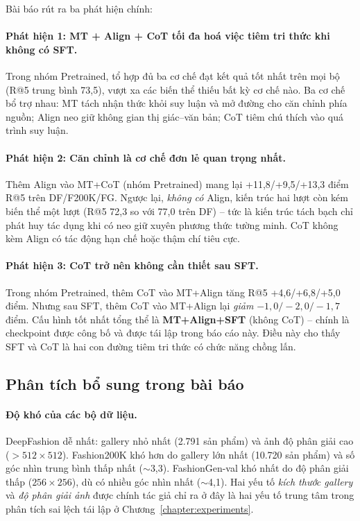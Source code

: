 Bài báo rút ra ba phát hiện chính:

\paragraph{Phát hiện 1: MT + Align + CoT tối đa hoá việc tiêm tri thức khi không có SFT.} Trong nhóm Pretrained, tổ hợp đủ ba cơ chế đạt kết quả tốt nhất trên mọi bộ (R@5 trung bình 73,5), vượt xa các biến thể thiếu bất kỳ cơ chế nào. Ba cơ chế bổ trợ nhau: MT tách nhận thức khỏi suy luận và mở đường cho căn chỉnh phía nguồn; Align neo giữ không gian thị giác--văn bản; CoT tiêm chú thích vào quá trình suy luận.

\paragraph{Phát hiện 2: Căn chỉnh là cơ chế đơn lẻ quan trọng nhất.} Thêm Align vào MT+CoT (nhóm Pretrained) mang lại +11,8/+9,5/+13,3 điểm R@5 trên DF/F200K/FG. Ngược lại, \emph{không có} Align, kiến trúc hai lượt còn kém biến thể một lượt (R@5 72,3 so với 77,0 trên DF) -- tức là kiến trúc tách bạch chỉ phát huy tác dụng khi có neo giữ xuyên phương thức tường minh. CoT không kèm Align có tác động hạn chế hoặc thậm chí tiêu cực.

\paragraph{Phát hiện 3: CoT trở nên không cần thiết sau SFT.} Trong nhóm Pretrained, thêm CoT vào MT+Align tăng R@5 +4,6/+6,8/+5,0 điểm. Nhưng sau SFT, thêm CoT vào MT+Align lại \emph{giảm} $-1{,}0/-2{,}0/-1{,}7$ điểm. Cấu hình tốt nhất tổng thể là \textbf{MT+Align+SFT} (không CoT) -- chính là checkpoint được công bố và được tái lập trong báo cáo này. Điều này cho thấy SFT và CoT là hai con đường tiêm tri thức có chức năng chồng lấn.

\subsection{Phân tích bổ sung trong bài báo}

\paragraph{Độ khó của các bộ dữ liệu.} DeepFashion dễ nhất: gallery nhỏ nhất (2.791 sản phẩm) và ảnh độ phân giải cao ($>512 \times 512$). Fashion200K khó hơn do gallery lớn nhất (10.720 sản phẩm) và số góc nhìn trung bình thấp nhất ($\sim$3,3). FashionGen-val khó nhất do độ phân giải thấp ($256 \times 256$), dù có nhiều góc nhìn nhất ($\sim$4,1). Hai yếu tố \emph{kích thước gallery} và \emph{độ phân giải ảnh} được chính tác giả chỉ ra ở đây là hai yếu tố trung tâm trong phân tích sai lệch tái lập ở Chương~\ref{chapter:experiments}.

